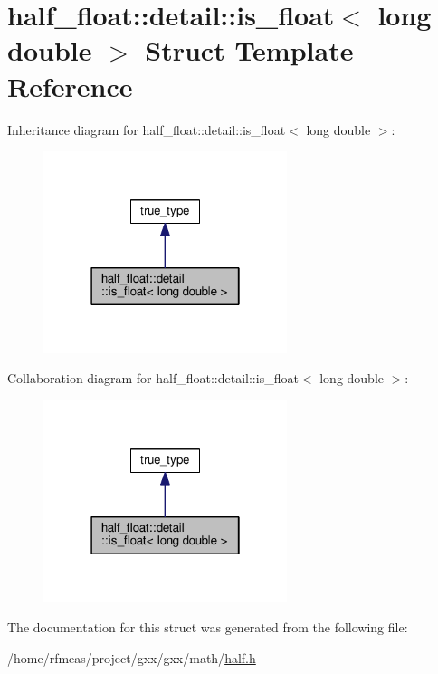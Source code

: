 \hypertarget{structhalf__float_1_1detail_1_1is__float_3_01long_01double_01_4}{}\section{half\+\_\+float\+:\+:detail\+:\+:is\+\_\+float$<$ long double $>$ Struct Template Reference}
\label{structhalf__float_1_1detail_1_1is__float_3_01long_01double_01_4}


Inheritance diagram for half\+\_\+float\+:\+:detail\+:\+:is\+\_\+float$<$ long double $>$\+:
\nopagebreak
\begin{figure}[H]
\begin{center}
\leavevmode
\includegraphics[width=202pt]{structhalf__float_1_1detail_1_1is__float_3_01long_01double_01_4__inherit__graph}
\end{center}
\end{figure}


Collaboration diagram for half\+\_\+float\+:\+:detail\+:\+:is\+\_\+float$<$ long double $>$\+:
\nopagebreak
\begin{figure}[H]
\begin{center}
\leavevmode
\includegraphics[width=202pt]{structhalf__float_1_1detail_1_1is__float_3_01long_01double_01_4__coll__graph}
\end{center}
\end{figure}


The documentation for this struct was generated from the following file\+:\begin{DoxyCompactItemize}
\item 
/home/rfmeas/project/gxx/gxx/math/\hyperlink{half_8h}{half.\+h}\end{DoxyCompactItemize}
